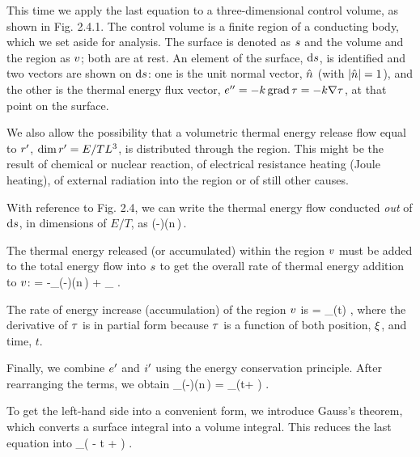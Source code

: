 This time we apply the last equation to a three-dimensional control volume, as shown in Fig. 2.4.1. The control volume is a finite region of a conducting body, which we set aside for analysis. The surface is denoted as $s$ and the volume and the region as $v$; both are at rest. An element of the surface, $\text{d}s$, is identified and two vectors are shown on $\text{d}s$: one is the unit normal vector, $\hat{n}$ (with $\vert{\hat{n}}\vert = 1$), and the other is the thermal energy flux vector, ${e}^{\prime\prime} = -k\operatorname{grad}\tau = -k\nabla\tau$, at that point on the surface.

We also allow the possibility that a volumetric thermal energy release flow equal to ${r}^{\prime}$, $\dim{r}^{\prime} = E/TL^3$, is distributed through the region. This might be the result of chemical or nuclear reaction, of electrical resistance heating (Joule heating), of external radiation into the region or of still other causes.

With reference to Fig. 2.4, we can write the thermal energy flow conducted \emph{out} of $\text{d}s$, in dimensions of $E/T$, as
\beq
\left(-\kthcond\gder\temp\right)\iprod\left(\uvec n\,\dx\surf\right)\,.
\eeq

The thermal energy released (or accumulated) within the region $v$ must be added to the total energy flow into $s$ to get the overall rate of thermal energy addition to $v$:
\beq
\flow\then = -\int_{\surf}\left(-\kthcond\gder\temp\right)\iprod\left(\uvec n\,\dx\surf\right)
             + \int_{\vol}\flow\chthen\,\dx\vol\,.
\eeq

The rate of energy increase (accumulation) of the region $v$ is
\beq
\accu\ien = \int_{\vol}\left(\ipd t\dens\kshcap\temp\right)\,\dx\vol\,,
\eeq
where the derivative of $\tau$ is in partial form because $\tau$ is a function of both position, $\xi$, and time, $t$.

Finally, we combine ${e}^{\prime}$ and ${i}^{\prime}$ using the energy conservation principle. After rearranging the terms, we obtain
\beq
\int_{\surf}\left(-\kthcond\gder\temp\right)\iprod\left(\uvec n\,\dx\surf\right)
    =
\int_{\vol}\left(\ipd t\dens\kshcap\temp + \flow\chthen\right)\,\dx\vol\,.
\eeq

To get the left-hand side into a convenient form, we introduce Gauss's theorem, which converts a surface integral into a volume integral. This reduces the last equation into
\beq
\int_{\vol}\left(\gder\iprod\kthcond\gder\temp 
                    - \ipd t\dens\kshcap\temp 
                    + \flow\chthen
            \right)\,\dx\vol\,.
\eeq

